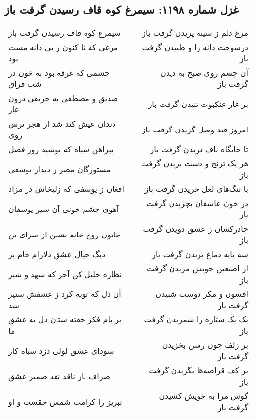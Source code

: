 \begin{center}
\section*{غزل شماره ۱۱۹۸: سیمرغ کوه قاف رسیدن گرفت باز}
\label{sec:1198}
\begin{longtable}{l p{0.5cm} r}
سیمرغ کوه قاف رسیدن گرفت باز
&&
مرغ دلم ز سینه پریدن گرفت باز
\\
مرغی که تا کنون ز پی دانه مست بود
&&
درسوخت دانه را و طپیدن گرفت باز
\\
چشمی که غرقه بود به خون در شب فراق
&&
آن چشم روی صبح به دیدن گرفت باز
\\
صدیق و مصطفی به حریفی درون غار
&&
بر غار عنکبوت تنیدن گرفت باز
\\
دندان عیش کند شد از هجر ترش روی
&&
امروز قند وصل گزیدن گرفت باز
\\
پیراهن سیاه که پوشید روز فصل
&&
تا جایگاه ناف دریدن گرفت باز
\\
مستورگان مصر ز دیدار یوسفی
&&
هر یک ترنج و دست بریدن گرفت باز
\\
افغان ز یوسفی که زلیخاش در مزاد
&&
با تنگ‌های لعل خریدن گرفت باز
\\
آهوی چشم خونی آن شیر یوسفان
&&
در خون عاشقان بچریدن گرفت باز
\\
خاتون روح خانه نشین از سرای تن
&&
چادرکشان ز عشق دویدن گرفت باز
\\
دیگ خیال عشق دلارام خام پز
&&
سه پایه دماغ پزیدن گرفت باز
\\
نظاره خلیل کن آخر که شهد و شیر
&&
از اصبعین خویش مزیدن گرفت باز
\\
آن دل که توبه کرد ز عشقش ستیز شد
&&
افسون و مکر دوست شنیدن گرفت باز
\\
بر بام فکر خفته ستان دل به عشق ما
&&
یک یک ستاره را شمریدن گرفت باز
\\
سودای عشق لولی دزد سیاه کار
&&
بر زلف چون رسن بخزیدن گرفت باز
\\
صراف ناز ناقد نقد ضمیر عشق
&&
بر کف قراضه‌ها بگزیدن گرفت باز
\\
تبریز را کرامت شمس حقست و او
&&
گوش مرا به خویش کشیدن گرفت باز
\\
\end{longtable}
\end{center}
